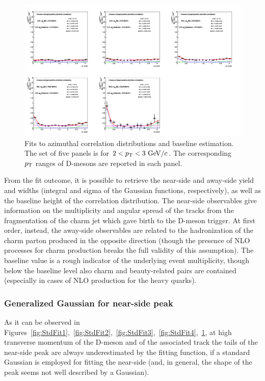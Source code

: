 \begin{figure}[h]
\centering
\includegraphics[width=0.99\linewidth, height=0.70\linewidth,angle=270]{figures/Fits/cFitting_0_pthad2dot0to3dot0.png}
\caption{Fits to azimuthal correlation distributions and baseline estimation. The set of five panels is for $2<p_{\rm T}<3~\mathrm{GeV}/c$. The corresponding $p_{\rm T}$ ranges of D-mesons are reported in each panel.}
\label{fig:StdFit5}
\end{figure}

From the fit outcome, it is possible to retrieve the near-side and away-side yield and widths (integral and sigma of the Gaussian functions, respectively), as well as the baseline height of the correlation distribution. The near-side observables give information on the multiplicity and angular spread of the tracks from the fragmentation of the charm jet which gave birth to the D-meson trigger. At first order, instead, the away-side observables are related to the hadronization of the charm parton produced in the opposite direction (though the presence of NLO processes for charm production breaks the full validity of this assumption). The baseline value is a rough indicator of the underlying event multiplicity, though below the baseline level also charm and beauty-related pairs are contained (especially in cases of NLO production for the heavy quarks).
\clearpage

\subsubsection{Generalized Gaussian for near-side peak}
As it can be observed in Figures~\ref{fig:StdFit1},~\ref{fig:StdFit2},~\ref{fig:StdFit3},~\ref{fig:StdFit4},~\ref{fig:StdFit5}, at high transverse momentum of the D-meson and of the associated track the tails of the near-side peak are always underestimated by the fitting function, if a standard Gaussian is employed for fitting the near-side (and, in general, the shape of the peak seems not well described by a Gaussian).

